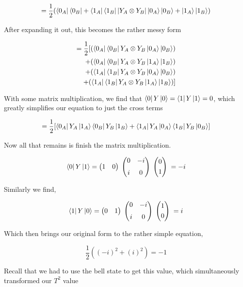 \documentclass[12pt]{article}
\begin{document}
\[
= \frac{1}{2} ( \bra{0_A} \bra{0_B} + \bra{1_A} \bra{1_B} | Y_A \otimes Y_B | \ket{0_A} \ket{0_B} + \ket{1_A} \ket{1_B} )
\]

After expanding it out, this becomes the rather messy form

\begin{align*}
= \frac{1}{2}[
  (\bra{0_A} \bra{0_B} Y_A \otimes Y_B \ket{0_A} \ket{0_B})  \\
+ (\bra{0_A} \bra{0_B} Y_A \otimes Y_B \ket{1_A} \ket{1_B}) \\
+ (\bra{1_A} \bra{1_B} Y_A \otimes Y_B \ket{0_A} \ket{0_B}) \\
+ (\bra{1_A} \bra{1_B} Y_A \otimes Y_B \ket{1_A} \ket{1_B})
]
\end{align*}

With some matrix multiplication, we find that $\bra{0}Y\ket{0} = \bra{1}Y\ket{1}=0$, which greatly simplifies our equation to just the cross terms

\[
= \frac{1}{2}[
\bra{0_A} Y_A \ket{1_A}\bra{0_B} Y_B \ket{1_B} 
+ \bra{1_A} Y_A \ket{0_A} \bra{1_B} Y_B  \ket{0_B}]
\]

Now all that remains is finish the matrix multiplication.

\[
\bra{0}Y\ket{1} = \begin{pmatrix} 1 & 0 \end{pmatrix}
\;
\begin{pmatrix}
  0 & -i \\[6pt]
  i & 0
\end{pmatrix}
\;
\begin{pmatrix} 0 \\[3pt] 1 \end{pmatrix}
\;= -i
\]

Similarly we find,

\[
\bra{1}Y\ket{0} = \begin{pmatrix} 0 & 1 \end{pmatrix}
\;
\begin{pmatrix}
  0 & -i \\[6pt]
  i & 0
\end{pmatrix}
\;
\begin{pmatrix} 1 \\[3pt] 0 \end{pmatrix}
\;= i
\]

Which then brings our original form to the rather simple equation,

\[
\frac{1}{2}((-i)^2 + (i)^2) = -1
\]

Recall that we had to use the bell state to get this value, which simultaneously transformed our $T^2$ value
\end{document}
